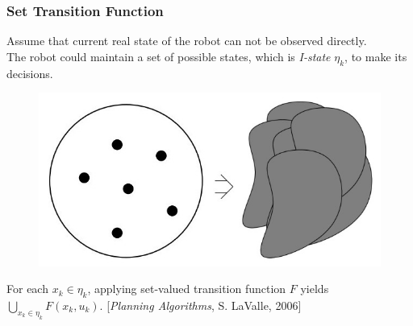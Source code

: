 \documentclass[compress]{beamer}
\begin{document}
\begin{frame}\frametitle{Set Transition Function}
Assume that current real state of the robot can not be observed directly. \\

The robot could maintain a set of possible states, which is \emph{I-state} $\eta_k$,
 to make its decisions.
\begin{description}
\item \begin{figure}
    \includegraphics[scale=0.3]{xk_u.jpg}
    \end{figure}
\item For each $x_k \in \eta_k$, applying set-valued transition function $F$ yields $\bigcup_{x_k \in \eta_k} F(x_k, u_k)$.
    [\emph{Planning Algorithms}, S. LaValle, 2006]
\end{description}
\transboxout
\end{frame}
\end{document}
